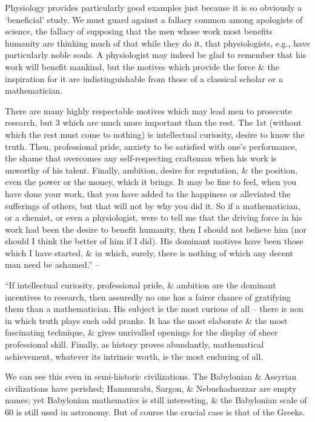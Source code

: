 \documentclass{article}
\numberwithin{equation}{section}
\begin{document}
Physiology provides particularly good examples just because it is so obviously a `beneficial' study. We must guard against a fallacy common among apologists of science, the fallacy of supposing that the men whose work most benefits humanity are thinking much of that while they do it, that physiologists, e.g., have particularly noble souls. A physiologist may indeed be glad to remember that his work will benefit mankind, but the motives which provide the force \& the inspiration for it are indistinguishable from those of a classical scholar or a mathematician.

There are many highly respectable motives which may lead men to prosecute research, but 3 which are much more important than the rest. The 1st (without which the rest must come to nothing) is intellectual curiosity, desire to know the truth. Then, professional pride, anxiety to be satisfied with one's performance, the shame that overcomes any self-respecting craftsman when his work is unworthy of his talent. Finally, ambition, desire for reputation, \& the position, even the power or the money, which it brings. It may be fine to feel, when you have done your work, that you have added to the happiness or alleviated the sufferings of others, but that will not by why you did it. So if a mathematician, or a chemist, or even a physiologist, were to tell me that the driving force in his work had been the desire to benefit humanity, then I should not believe him (nor should I think the better of him if I did). His dominant motives have been those which I have started, \& in which, surely, there is nothing of which any decent man need be ashamed.'' -- \cite[pp. 77--79]{Hardy1992}

 ``If intellectual curiosity, professional pride, \& ambition are the dominant incentives to research, then assuredly no one has a fairer chance of gratifying them than a mathematician. His subject is the most curious of all -- there is non in which truth plays such odd pranks. It has the most elaborate \& the most fascinating technique, \& gives unrivalled openings for the display of sheer professional skill. Finally, as history proves abundantly, mathematical achievement, whatever its intrinsic worth, is the most enduring of all.

We can see this even in semi-historic civilizations. The Babylonian \& Assyrian civilizations have perished; Hammurabi, Sargon, \& Nebuchadnezzar are empty names; yet Babylonian mathematics is still interesting, \& the Babylonian scale of 60 is still used in astronomy. But of course the crucial case is that of the Greeks.
\end{document}
